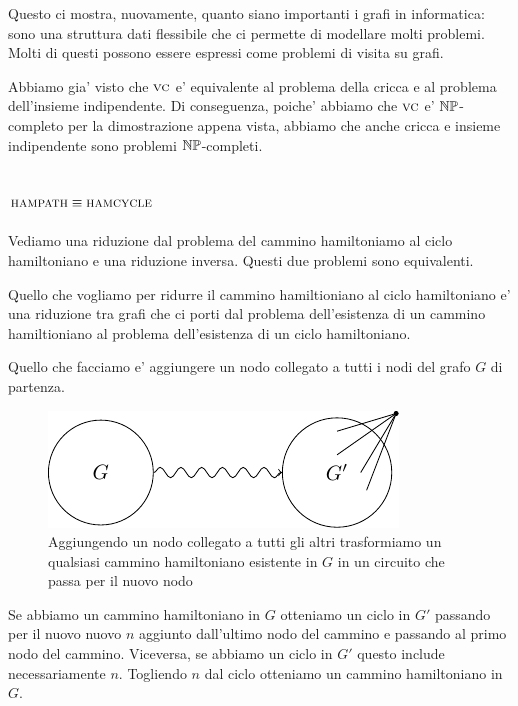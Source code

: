Questo ci mostra, nuovamente, quanto siano importanti i grafi in informatica: sono una struttura
dati flessibile che ci permette di modellare molti problemi. Molti di questi possono essere espressi
come problemi di visita su grafi.

Abbiamo gia' visto che $\textsc{vc}$ e' equivalente al problema della cricca e al problema dell'insieme
indipendente. Di conseguenza, poiche' abbiamo che $\textsc{vc}$ e' $\mathbb{NP}$-completo per la dimostrazione
appena vista, abbiamo che anche cricca e insieme indipendente sono problemi $\mathbb{NP}$-completi.

\subsection{$\textsc{hampath} \equiv \textsc{hamcycle}$}

Vediamo una riduzione dal problema del cammino hamiltoniamo al ciclo hamiltoniano e una riduzione
inversa. Questi due problemi sono equivalenti.

Quello che vogliamo per ridurre il cammino hamiltioniano al ciclo hamiltoniano e' una riduzione tra
grafi che ci porti dal problema dell'esistenza di un cammino hamiltioniano al problema
dell'esistenza di un ciclo hamiltoniano.

Quello che facciamo e' aggiungere un nodo collegato a tutti i nodi del grafo $G$ di partenza.

\begin{figure}[h]
    \begin{center}
        \includegraphics{./img/nondeterminism/HAMPATHCYCLE.pdf}
        \caption{Aggiungendo un nodo collegato a tutti gli altri trasformiamo un qualsiasi cammino
        hamiltoniano esistente in $G$ in un circuito che passa per il nuovo nodo}
    \end{center}
\end{figure}

Se abbiamo un cammino hamiltoniano in $G$ otteniamo un ciclo in $G'$ passando per il nuovo nuovo $n$
aggiunto dall'ultimo nodo del cammino e passando al primo nodo del cammino. Viceversa, se abbiamo un
ciclo in $G'$ questo include necessariamente $n$. Togliendo $n$ dal ciclo otteniamo un cammino
hamiltoniano in $G$.

